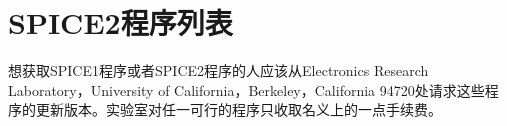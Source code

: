\chapter{SPICE2程序列表}
\label{App:5}
想获取SPICE1程序或者SPICE2程序的人应该从Electronics Research Laboratory，University of California，Berkeley，California 94720处请求这些程序的更新版本。实验室对任一可行的程序只收取名义上的一点手续费。

